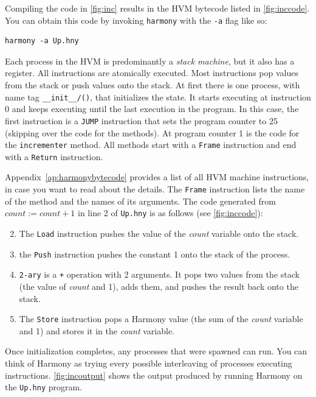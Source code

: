 \documentclass{report}
\newenvironment{code}{
\tcolorbox
}{
\endtcolorbox
}
\begin{document}
%

Compiling the code in \autoref{fig:inc} results in the HVM bytecode
listed in \autoref{fig:inccode}.
You can obtain this code by invoking \texttt{harmony} with the \texttt{-a} flag
like so:
\begin{code}
\begin{verbatim}
harmony -a Up.hny
\end{verbatim}
\end{code}
Each process in the HVM is predominantly a \emph{stack machine},
%
but it also has a register.
All instructions are atomically executed.
Most instructions pop values from the stack or push values onto the stack.
At first there is one process, with name tag \texttt{\_\_init\_\_/()},
that initializes the state.
It starts executing at instruction 0 and keeps executing until the last
execution in the program.
In this case, the first instruction is a \texttt{JUMP} instruction that sets the
program counter to 25 (skipping over the code for the methods).
At program counter 1 is the code for the \texttt{incrementer} method.
All methods start with a \texttt{Frame} instruction and end with a \texttt{Return}
instruction.

Appendix~\ref{ap:harmonybytecode} provides a list of all HVM machine instructions,
in case you want to read about the details.
The \texttt{Frame} instruction lists the name of the method and the
names of its arguments.
The code generated from $\mathit{count} := \mathit{count} + 1$ in line 2 of
\texttt{Up.hny} is as follows (see \autoref{fig:inccode}):

\begin{enumerate} \setcounter{enumi}{1}
\item The \texttt{Load} instruction pushes the value of the
\textit{count} variable onto the stack.
\item the \texttt{Push} instruction pushes the constant 1
onto the stack of the process.
\item \texttt{2-ary} is a \texttt{+} operation with 2 arguments.
It pops two values from the stack (the value of \textit{count} and 1),
adds them, and pushes the result back onto the stack.
\item The \texttt{Store} instruction pops
a Harmony value (the sum of the \textit{count} variable and 1) and
stores it in the \textit{count} variable.
\end{enumerate}

Once initialization completes, any processes that were spawned can run.
You can think of Harmony as trying every possible interleaving of processes executing
instructions.
\autoref{fig:incoutput} shows the output produced by running Harmony on the
\texttt{Up.hny} program.
\end{document}
